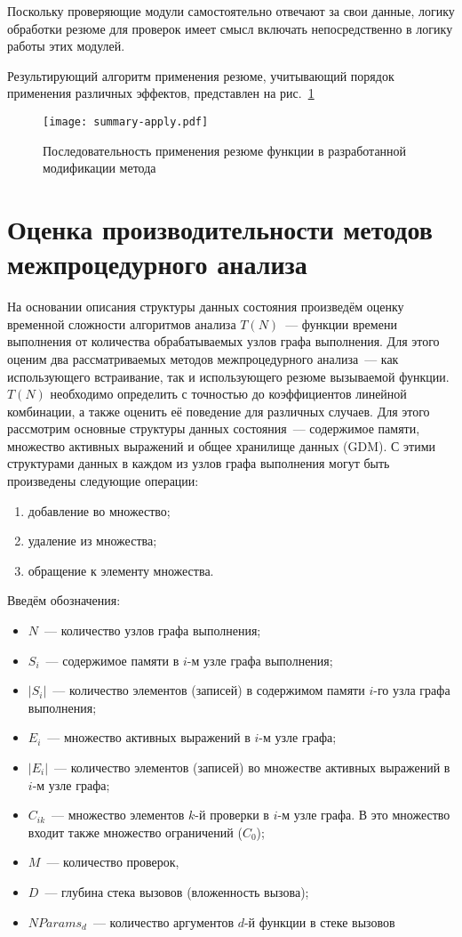 Поскольку проверяющие модули самостоятельно отвечают за свои данные, логику обработки резюме для проверок имеет смысл включать непосредственно в логику работы этих модулей.

Результирующий алгоритм применения резюме, учитывающий порядок применения различных эффектов, представлен на рис.~\ref{pic:summary-apply}


\begin{figure}
   \centering
   \texttt{[image: summary-apply.pdf]}
   \caption{Последовательность применения резюме функции в разработанной модификации метода}\label{pic:summary-apply}
\end{figure}

\section{Оценка производительности методов межпроцедурного анализа}

На основании описания структуры данных состояния произведём оценку временной сложности алгоритмов анализа $T(N)$~--- функции времени выполнения от количества обрабатываемых узлов графа выполнения.  Для этого оценим два рассматриваемых методов межпроцедурного анализа~--- как использующего встраивание, так и использующего резюме вызываемой функции. $T(N)$ необходимо определить с точностью до коэффициентов линейной комбинации, а также оценить её поведение для различных случаев. Для этого рассмотрим основные структуры данных состояния~--- содержимое памяти, множество активных выражений и общее хранилище данных (GDM). С этими структурами данных в каждом из узлов графа выполнения могут быть произведены следующие операции:
\begin{enumerate}
 \item добавление во множество;
 \item удаление из множества;
 \item обращение к элементу множества.
\end{enumerate}

 Введём обозначения:

\begin {itemize}
 \item $N$~--- количество узлов графа выполнения;
 \item $S_i$~--- содержимое памяти в $i$-м узле графа выполнения;
 \item $|S_i|$~--- количество элементов (записей) в содержимом памяти $i$-го узла графа выполнения;
 \item $E_i$~--- множество активных выражений в $i$-м узле графа;
 \item $|E_i|$~--- количество элементов (записей) во множестве активных выражений в $i$-м узле графа;
 \item $C_{ik}$~--- множество элементов $k$-й проверки в $i$-м узле графа. В это множество входит также множество ограничений ($C_0$);
 \item $M$~--- количество проверок,
 \item $D$~--- глубина стека вызовов (вложенность вызова);
 \item $NParams_d$~--- количество аргументов $d$-й функции в стеке вызовов
\end {itemize}

